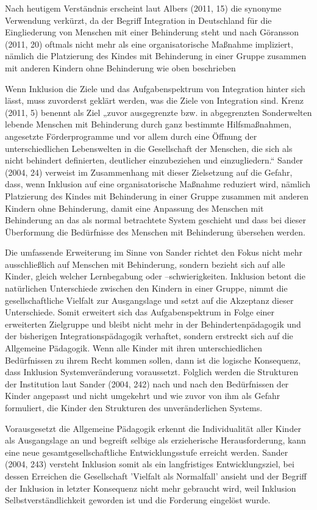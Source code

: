Nach heutigem Verständnis erscheint laut Albers (2011, 15) die synonyme Verwendung verkürzt, da der Begriff Integration in Deutschland für die Eingliederung von Menschen mit einer Behinderung steht und nach Göransson (2011, 20) oftmals nicht mehr als eine organisatorische Maßnahme impliziert, nämlich die Platzierung des Kindes mit Behinderung in einer Gruppe zusammen mit anderen Kindern ohne Behinderung wie oben beschrieben

Wenn Inklusion die Ziele und das Aufgabenspektrum von Integration hinter sich lässt, muss zuvorderst geklärt werden, was die Ziele von Integration sind. 
Krenz (2011, 5) benennt als Ziel „zuvor ausgegrenzte bzw. in abgegrenzten Sonderwelten lebende Menschen mit Behinderung durch ganz bestimmte Hilfsmaßnahmen, angesetzte Förderprogramme und vor allem durch eine Öffnung der unterschiedlichen Lebenswelten in die Gesellschaft der Menschen, die sich als nicht behindert definierten, deutlicher einzubeziehen und einzugliedern.“ Sander (2004, 24) verweist im Zusammenhang mit dieser Zielsetzung auf die Gefahr, dass, wenn Inklusion auf eine organisatorische Maßnahme reduziert wird, nämlich Platzierung des Kindes mit Behinderung in einer Gruppe zusammen mit anderen Kindern ohne Behinderung, damit eine Anpassung des Menschen mit Behinderung an das als normal betrachtete System geschieht und dass bei dieser Überformung die Bedürfnisse des Menschen mit Behinderung übersehen werden. 

Die umfassende Erweiterung im Sinne von Sander richtet den Fokus nicht mehr ausschließlich auf Menschen mit Behinderung, sondern bezieht sich auf alle Kinder, gleich welcher Lernbegabung oder --schwierigkeiten. Inklusion betont die natürlichen Unterschiede zwischen den Kindern in einer Gruppe, nimmt die gesellschaftliche Vielfalt zur Ausgangslage und setzt auf die Akzeptanz dieser Unterschiede. Somit erweitert sich das Aufgabenspektrum in Folge einer erweiterten Zielgruppe und bleibt nicht mehr in der Behindertenpädagogik und der bisherigen Integrationspädagogik verhaftet, sondern erstreckt sich auf die Allgemeine Pädagogik. Wenn alle Kinder mit ihren unterschiedlichen Bedürfnissen zu ihrem Recht kommen sollen, dann ist die logische Konsequenz, dass Inklusion Systemveränderung voraussetzt. Folglich werden die Strukturen der Institution laut Sander (2004, 242) nach und nach den Bedürfnissen der Kinder angepasst und nicht umgekehrt und wie zuvor von ihm als Gefahr formuliert, die Kinder den Strukturen des unveränderlichen Systems.

Vorausgesetzt die Allgemeine Pädagogik erkennt die Individualität aller Kinder als Ausgangslage an und begreift selbige als erzieherische Herausforderung, kann eine neue gesamtgesellschaftliche Entwicklungsstufe erreicht werden. Sander (2004, 243) versteht Inklusion somit als ein langfristiges Entwicklungsziel, bei dessen Erreichen die Gesellschaft 'Vielfalt als Normalfall' ansieht und der Begriff der Inklusion in letzter Konsequenz nicht mehr gebraucht wird, weil Inklusion Selbstverständlichkeit geworden ist und die Forderung eingelöst wurde.  

